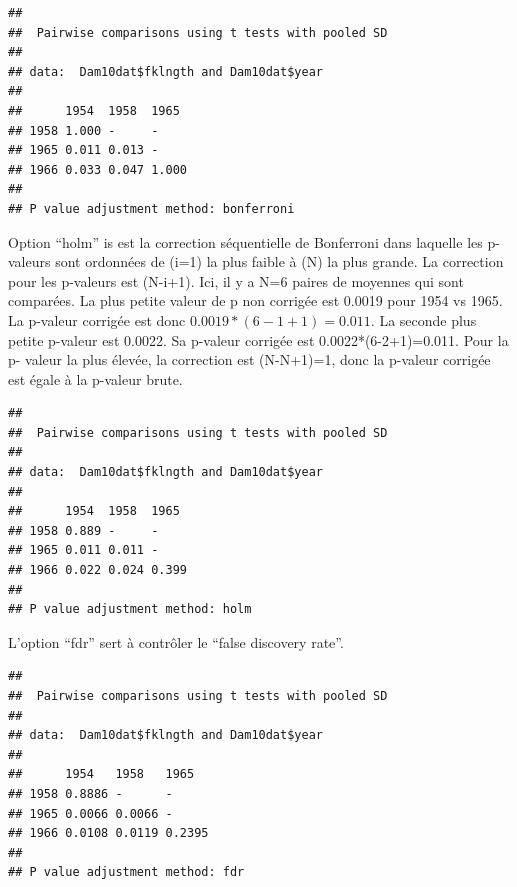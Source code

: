 \documentclass[12pt,]{book}
\newenvironment{Shaded}{\begin{snugshade}}{\end{snugshade}}
\newcommand{\DataTypeTok}[1]{\textcolor[rgb]{0.27,0.27,0.27}{#1}}
\newcommand{\KeywordTok}[1]{\textcolor[rgb]{0.27,0.27,0.27}{\textbf{#1}}}
\newcommand{\NormalTok}[1]{#1}
\newcommand{\OperatorTok}[1]{\textcolor[rgb]{0.43,0.43,0.43}{\textbf{#1}}}
\newcommand{\StringTok}[1]{\textcolor[rgb]{0.5,0.5,0.5}{#1}}
\begin{document}
\begin{verbatim}
## 
## 	Pairwise comparisons using t tests with pooled SD 
## 
## data:  Dam10dat$fklngth and Dam10dat$year 
## 
##      1954  1958  1965 
## 1958 1.000 -     -    
## 1965 0.011 0.013 -    
## 1966 0.033 0.047 1.000
## 
## P value adjustment method: bonferroni
\end{verbatim}

Option ``holm'' is est la correction séquentielle de Bonferroni dans laquelle les p-valeurs sont ordonnées de (i=1) la plus faible à (N) la plus grande. La correction pour les p-valeurs est (N-i+1). Ici, il y a N=6 paires de moyennes qui sont comparées. La plus petite valeur de p non corrigée est 0.0019 pour 1954 vs 1965. La p-valeur corrigée est donc \(0.0019*(6-1+1)=0.011\). La seconde plus petite p-valeur est 0.0022. Sa p-valeur corrigée est 0.0022*(6-2+1)=0.011. Pour la p- valeur la plus élevée, la correction est (N-N+1)=1, donc la p-valeur corrigée est égale à la p-valeur brute.

\begin{Shaded}
\end{Shaded}

\begin{verbatim}
## 
## 	Pairwise comparisons using t tests with pooled SD 
## 
## data:  Dam10dat$fklngth and Dam10dat$year 
## 
##      1954  1958  1965 
## 1958 0.889 -     -    
## 1965 0.011 0.011 -    
## 1966 0.022 0.024 0.399
## 
## P value adjustment method: holm
\end{verbatim}

L'option ``fdr'' sert à contrôler le ``false discovery rate''.

\begin{Shaded}
\end{Shaded}

\begin{verbatim}
## 
## 	Pairwise comparisons using t tests with pooled SD 
## 
## data:  Dam10dat$fklngth and Dam10dat$year 
## 
##      1954   1958   1965  
## 1958 0.8886 -      -     
## 1965 0.0066 0.0066 -     
## 1966 0.0108 0.0119 0.2395
## 
## P value adjustment method: fdr
\end{verbatim}
\end{document}
